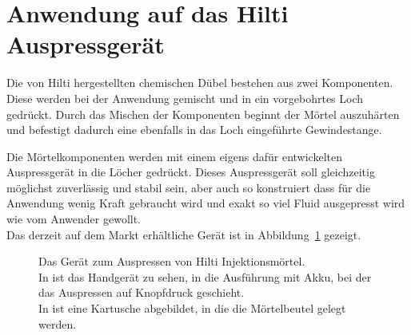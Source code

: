 \section{Anwendung auf das Hilti Auspressgerät}
\label{Kapitel:Auspressgeraet}
Die von Hilti hergestellten chemischen Dübel bestehen aus zwei Komponenten. Diese werden bei der Anwendung gemischt und in ein vorgebohrtes Loch gedrückt. Durch das Mischen der Komponenten beginnt der Mörtel auszuhärten und befestigt dadurch eine ebenfalls in das Loch eingeführte Gewindestange.

Die Mörtelkomponenten werden mit einem eigens dafür entwickelten Auspressgerät in die Löcher gedrückt. Dieses Auspressgerät soll gleichzeitig möglichst zuverlässig und stabil sein, aber auch so konstruiert dass für die Anwendung wenig Kraft gebraucht wird und exakt so viel Fluid ausgepresst wird wie vom Anwender gewollt.\\
Das derzeit auf dem Markt erhältliche Gerät ist in Abbildung~\ref{fig:Auspressgeraet} gezeigt.
%
\begin{figure}[b]
    \centering
    \caption{Das Gerät zum Auspressen von Hilti Injektionsmörtel.\\In {} ist das Handgerät zu sehen, in  die Ausführung mit Akku, bei der das Auspressen auf Knopfdruck geschieht.\\
    In  ist eine Kartusche abgebildet, in die die Mörtelbeutel gelegt werden.}
    \label{fig:Auspressgeraet}
\end{figure}
%

